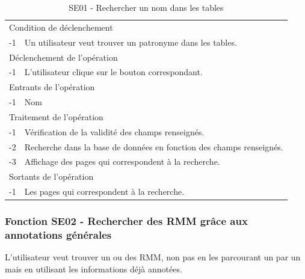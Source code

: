 \documentclass[a4paper]{article}
\begin{document}
\begin{table}[H]
  \centering
   \small
	\begin{tabular}{|c|p{12cm}|}
   		\hline
   			\rowcolor{lightgray}\multicolumn{2}{|c|}{\textbf{SE01 - Rechercher un nom dans les tables}} \\
   		\hline
   			\multicolumn{2}{|l|}{Condition de d\'eclenchement} \\
   		\hline
   			-1 & Un utilisateur veut trouver un patronyme dans les tables. \\
   		\hline
   			\multicolumn{2}{|l|}{D\'eclenchement de l'op\'eration} \\
   		\hline
   			-1 & L'utilisateur clique sur le bouton correspondant. \\
   		\hline
   			\multicolumn{2}{|l|}{Entrants de l'op\'eration} \\
   		\hline
   			-1 & Nom \\
   		\hline
   			\multicolumn{2}{|l|}{Traitement de l'op\'eration} \\
  		\hline
  			-1 & Vérification de la validité des champs renseignés. \\
   			-2 & Recherche dans la base de données en fonction des champs renseignés. \\
        	-3 & Affichage des pages qui correspondent à la recherche. \\
   		\hline
   			\multicolumn{2}{|l|}{Sortants de l'op\'eration} \\
   		\hline
   			-1 & Les pages qui correspondent à la recherche. \\
   		\hline
	\end{tabular}
  \caption{SE01 - Rechercher un nom dans les tables}
  \normalsize
  \label{tab:SE01}
\end{table}

\subsubsection{Fonction SE02 - Rechercher des RMM grâce aux annotations générales}

L'utilisateur veut trouver un ou des RMM, non pas en les parcourant un par un mais en utilisant les informations déjà annotées.
\\
\end{document}
